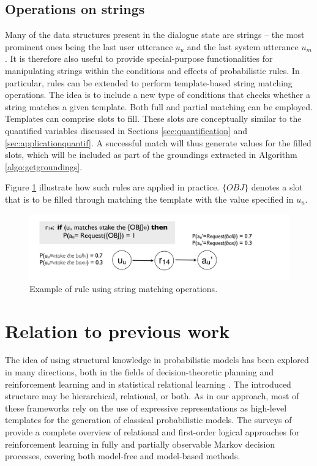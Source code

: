 \subsection{Operations on strings}

Many of the data structures present in the dialogue state are strings -- the most prominent ones being the last user utterance $u_u$ and the last system utterance $u_m$. It is therefore also useful to provide special-purpose functionalities for manipulating strings within the conditions and effects of probabilistic rules. In particular, rules can be extended to perform template-based string matching operations.  The idea is to include a new type of conditions that checks whether a string matches a given template.  Both full and partial matching can be employed. Templates can comprise slots to fill. These slots are conceptually similar to the quantified variables discussed in Sections \ref{sec:quantification} and \ref{sec:applicationquantif}. A successful match will thus generate values for the filled slots, which will be included as part of the groundings extracted in Algorithm \ref{algo:getgroundings}. 

Figure \ref{fig:stringmanip} illustrate how such rules are applied in practice.  $\{OBJ\}$ denotes a slot that is to be filled through matching the template with the value specified in $u_u$. 
\begin{figure}[h]
\centering
\includegraphics[scale=0.25]{imgs/stringmanip.pdf}
\caption{Example of rule using string matching operations.}
\label{fig:stringmanip}
\end{figure}

\section{Relation to previous work}
\label{sec:relatedwork}

The idea of using structural knowledge in probabilistic models has been explored in many directions, both in the fields of decision-theoretic planning and reinforcement learning \citep{Hauskrecht98,Pineau2004,KerstingR04,lang10jair,Otterlo2012} and in statistical relational learning \citep{Jaeger01,Richardson:2006,getoor:srlbook07}.  The introduced structure may be hierarchical, relational, or both. As in our approach, most of these frameworks rely on the use of expressive representations as high-level templates for the generation of classical probabilistic models.  The surveys of \cite{Otterlo2006,Otterlo2012} provide a complete overview of relational and first-order logical approaches for reinforcement learning in fully and partially observable Markov decision processes, covering both model-free and model-based methods. 

